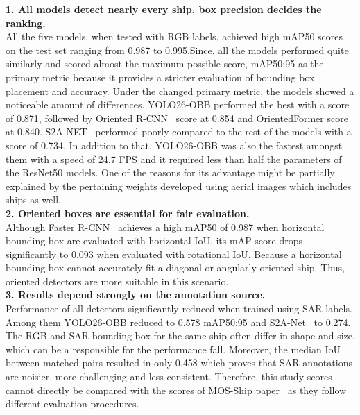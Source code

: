 \noindent\textbf{1. All models detect nearly every ship, box precision decides the ranking.}\\
All the five models, when tested with RGB labels, achieved high mAP50 scores on the test set ranging from 0.987 to 0.995.Since, all the models performed quite similarly and scored almost  the maximum possible score, mAP50:95 as the primary metric because it provides a stricter evaluation of bounding box placement and accuracy. Under the changed primary metric, the models showed a noticeable amount of  differences. YOLO26-OBB performed the best with a score of 0.871, followed by Oriented R-CNN~\cite{xie2021oriented} score at 0.854 and OrientedFormer score at 0.840. S2A-NET~\cite{han2021align} performed poorly compared to the rest of the models with a score of 0.734. In addition to that, YOLO26-OBB was also the fastest amongst them with a speed of  24.7 FPS and it required less than half the parameters of the ResNet50 models. One of the reasons for its advantage might be partially explained by the pertaining weights developed using aerial images which includes ships as well.\\

\noindent\textbf{2. Oriented boxes are essential for fair evaluation.}\\
Although Faster R-CNN~\cite{7485869} achieves a high mAP50 of 0.987 when horizontal bounding box are evaluated with horizontal IoU, its mAP score drops significantly to 0.093 when evaluated with rotational IoU. Because a horizontal bounding box cannot accurately fit a diagonal or angularly oriented ship. Thus, oriented detectors are more suitable in this scenario.\\

\noindent\textbf{3. Results depend strongly on the annotation source.}\\
Performance of all detectors significantly reduced when trained using SAR labels. Among them YOLO26-OBB reduced to 0.578 mAP50:95 and S2A-Net~\cite{han2021align} to 0.274. The RGB and SAR bounding box for the same ship often differ in shape and size, which can be a responsible for the performance fall. Moreover, the median IoU between matched pairs resulted in only 0.458 which proves that SAR annotations are noisier, more challenging and less consistent. Therefore, this study scores cannot directly be compared with the scores of  MOS-Ship paper~\cite{you2026multi} as they follow different evaluation procedures.\\

